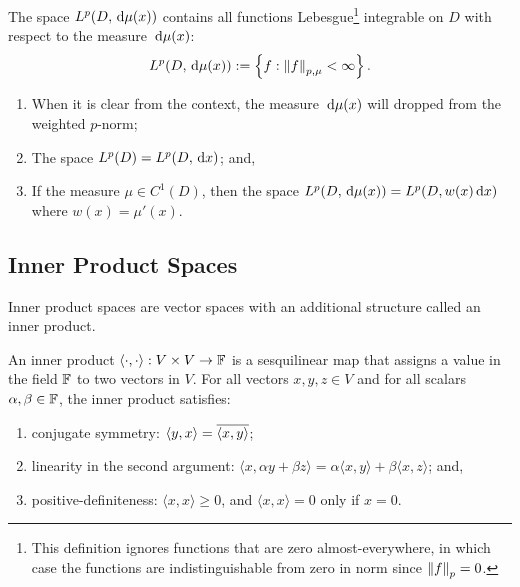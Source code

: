 \begin{definition}
The space $L^p(D,{\rm\,d}\mu(x))$ contains all functions Lebesgue\footnote{This definition ignores functions that are zero almost-everywhere, in which case the functions are indistinguishable from zero in norm since $\left\|{f}\right\|_p=0$.} integrable on $D$ with respect to the measure ${\rm\,d}\mu(x)$:
\begin{equation}
L^p(D,{\rm\,d}\mu(x)) := \left\{ f : \left\|{f}\right\|_{p,\mu} < \infty \right\}.
\end{equation}
\end{definition}

\begin{remark}
\begin{enumerate}
\item When it is clear from the context, the measure ${\rm\,d}\mu(x)$ will dropped from the weighted $p$-norm;
\item The space $L^p(D) = L^p(D,{\rm\,d} x)$; and,
\item If the measure $\mu \in C^1(D)$, then the space $L^p(D,{\rm\,d}\mu(x)) = L^p(D,w(x){\rm\,d}x)$ where $w(x) = \mu'(x)$.
\end{enumerate}
\end{remark}

\subsection{Inner Product Spaces}

Inner product spaces are vector spaces with an additional structure called an inner product.
\begin{definition}
An inner product $\langle\cdot,\cdot\rangle: V\times V\to\mathbb{F}$ is a sesquilinear map that assigns a value in the field $\mathbb{F}$ to two vectors in $V$. For all vectors $x,y,z\in V$ and for all scalars $\alpha,\beta\in\mathbb{F}$, the inner product satisfies:
\begin{enumerate}
\item conjugate symmetry: $\langle y,x\rangle = \overline{\langle x,y\rangle}$;
\item linearity in the second argument: $\langle x, \alpha y+\beta z\rangle = \alpha\langle x,y\rangle + \beta\langle x,z\rangle$; and,
\item positive-definiteness: $\langle x,x\rangle \ge 0$, and $\langle x,x\rangle = 0$ only if $x = 0$.
\end{enumerate}
\end{definition}

